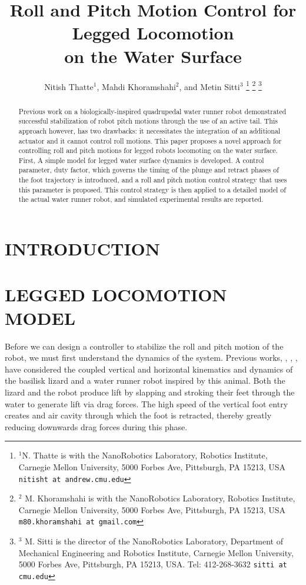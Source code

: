 \documentclass[letterpaper, 10 pt, conference]{ieeeconf}  %
\title{\LARGE \bf
Roll and Pitch Motion Control for Legged Locomotion \\ on the Water Surface
}
\author{Nitish Thatte$^{1}$, Mahdi Khoramshahi$^{2}$, and Metin Sitti$^{3}$%
\thanks{$^{1}$N. Thatte is with the NanoRobotics Laboratory, Robotics Institute, Carnegie Mellon University, 5000 Forbes Ave, Pittsburgh, PA 15213, USA 
	{\tt\small nitisht at andrew.cmu.edu}}%
\thanks{$^{2}$ M. Khoramshahi is with the NanoRobotics Laboratory, Robotics Institute, Carnegie Mellon University, 5000 Forbes Ave, Pittsburgh, PA 15213, USA 
	{\tt\small m80.khoramshahi at gmail.com}}
\thanks{$^{3}$ M. Sitti is the director of the NanoRobotics Laboratory, Department of Mechanical Engineering and Robotics Institute, Carnegie Mellon University, 5000 Forbes Ave, Pittsburgh, PA 15213, USA. Tel: 412-268-3632
	{\tt\small sitti at cmu.edu}}
}
\begin{document}
\maketitle
\thispagestyle{empty}
\pagestyle{empty}

\begin{abstract}
	Previous work on a biologically-inspired quadrupedal water runner robot demonstrated successful stabilization of robot pitch motions through the use of an active tail. This approach however, has two drawbacks: it necessitates the integration of an additional actuator and  it cannot control roll motions. This paper proposes a novel approach for controlling roll and pitch motions for legged robots locomoting on the water surface. First, A simple model for legged water surface dynamics is developed. A control parameter, duty factor, which governs the timing of the plunge and retract phases of the foot trajectory is introduced, and a roll and pitch motion control strategy that uses this parameter is proposed. This control strategy is then applied to a detailed model of the actual water runner robot, and simulated experimental results are reported.
\end{abstract}

\section{INTRODUCTION}

\section{LEGGED LOCOMOTION MODEL}

Before we can design a controller to stabilize the roll and pitch motion of the robot, we must first understand the dynamics of the system. Previous works, \cite{glasheen1996hydrodynamic}, \cite{floyd2008design}, \cite{hsieh2004running}, have considered the coupled vertical and horizontal kinematics and dynamics of the basilisk lizard and a water runner robot inspired by this animal. Both the lizard and the robot produce lift by slapping and stroking their feet through the water to generate lift via drag forces. The high speed of the vertical foot entry creates and air cavity through which the foot is retracted, thereby greatly reducing downwards drag forces during this phase.
\end{document}
